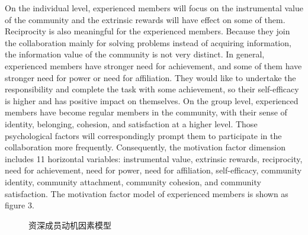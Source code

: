 \documentclass{elsarticle}
\begin{document}
   On the individual level, experienced members will focus on the
   instrumental value of the community and the extrinsic rewards will
   have effect on some of them. Reciprocity is also meaningful for the
   experienced members. Because they join the collaboration mainly for
   solving problems instead of acquiring information, the information
   value of the community is not very distinct. In general,
   experienced members have stronger need for achievement, and some of
   them have stronger need for power or need for affiliation. They
   would like to undertake the responsibility and complete the task
   with some achievement, so their self-efficacy is higher and has
   positive impact on themselves. On the group level, experienced
   members have become regular members in the community, with their
   sense of identity, belonging, cohesion, and satisfaction at a
   higher level. Those psychological factors will correspondingly
   prompt them to participate in the collaboration more
   frequently. Consequently, the motivation factor dimension includes
   11 horizontal variables: instrumental value, extrinsic rewards,
   reciprocity, need for achievement, need for power, need for
   affiliation, self-efficacy, community identity, community
   attachment, community cohesion, and community satisfaction. The
   motivation factor model of experienced members is shown as figure
   3.
\begin{figure}[htpb]
  \centering
  \label{fig:senior member}
  \caption{资深成员动机因素模型}
\end{figure}
\end{document}
